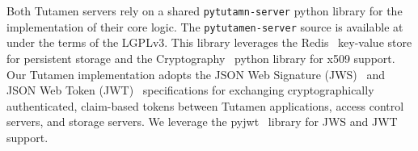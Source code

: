 Both Tutamen servers rely on a shared \texttt{pytutamn-server} python
library for the implementation of their core logic. The
\texttt{pytutamen-server} source is available
at~\cite{src-tutamen-pytutamenserver} under the terms of the
LGPLv3. This library leverages the Redis~\cite{redis} key-value store
for persistent storage and the Cryptography~\cite{python-cryptography}
python library for x509 support. Our Tutamen implementation adopts the
JSON Web Signature (JWS)~\cite{rfc7515} and JSON Web Token
(JWT)~\cite{rfc7519} specifications for exchanging cryptographically
authenticated, claim-based tokens between Tutamen applications, access
control servers, and storage servers. We leverage the
pyjwt~\cite{pyjwt} library for JWS and JWT support.


